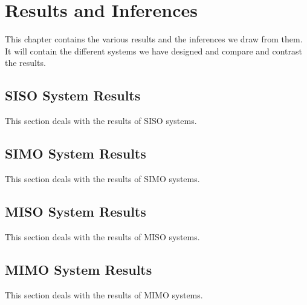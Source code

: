 \chapter{Results and Inferences}

This chapter contains the various results and the inferences we draw from them. It will contain the different systems we have designed and compare and contrast the results.


\section{SISO System Results}
This section deals with the results of SISO systems.

\section{SIMO System Results}
This section deals with the results of SIMO systems.

\section{MISO System Results}
This section deals with the results of MISO systems.

\section{MIMO System Results}
This section deals with the results of MIMO systems.

